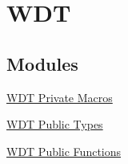 \hypertarget{group___w_d_t}{\section{\-W\-D\-T}
\label{group___w_d_t}
}
\subsection*{\-Modules}
\begin{DoxyCompactItemize}
\item 
\hyperlink{group___w_d_t___private___macros}{\-W\-D\-T Private Macros}
\item 
\hyperlink{group___w_d_t___public___types}{\-W\-D\-T Public Types}
\item 
\hyperlink{group___w_d_t___public___functions}{\-W\-D\-T Public Functions}
\end{DoxyCompactItemize}
